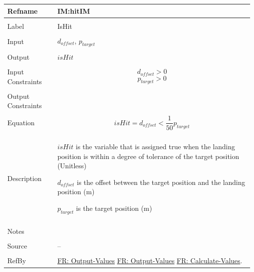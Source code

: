 \documentclass[12pt]{article}
\begin{document}
\noindent \begin{minipage}{\textwidth}
\begin{tabular}{p{} p{}}
\toprule \textbf{Refname} & \textbf{IM:hitIM}
\label{IM:hitIM}
\\ \midrule \\
Label & IsHit
\\ \midrule \\
Input & ${d_{offset}}$, ${p_{target}}$
\\ \midrule \\
Output & $isHit$
\\ \midrule \\
Input Constraints & \begin{displaymath}
                    {d_{offset}}>0
                    \end{displaymath}
                    \begin{displaymath}
                    {p_{target}}>0
                    \end{displaymath}
\\ \midrule \\
Output Constraints & 
\\ \midrule \\
Equation & \begin{displaymath}
           isHit={d_{offset}}<\frac{1}{50} {p_{target}}
           \end{displaymath}
\\ \midrule \\
Description & \begin{symbDescription}
              \item{$isHit$ is the variable that is assigned true when the landing position is within a degree of tolerance of the target position (Unitless)}
              \item{${d_{offset}}$ is the offset between the target position and the landing position (m)}
              \item{${p_{target}}$ is the target position (m)}
              \end{symbDescription}
\\ \midrule \\
Notes & 
\\ \midrule \\
Source & --
\\ \midrule \\
RefBy & \hyperref[outputValues]{FR: Output-Values} \hyperref[outputValues]{FR: Output-Values} \hyperref[calcValues]{FR: Calculate-Values}.
\\ \bottomrule \end{tabular}
\end{minipage}
\end{document}
